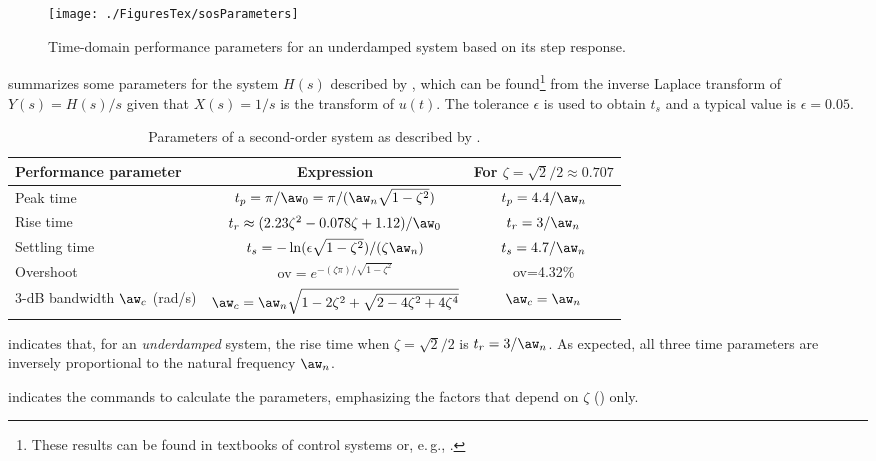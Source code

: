 \begin{figure}
\centering
\texttt{[image: ./FiguresTex/sosParameters]}
\caption{Time-domain performance parameters for an
underdamped system based on its step response.\label{fig:sosParameters}}
\end{figure}

 summarizes some parameters for the system $H(s)$ described by
, which can be found\footnote{These results can be found in
textbooks of control systems or, e.\,g., .} from the inverse Laplace transform of $Y(s) =  H(s)/s$ given that $X(s)=1/s$ is the transform of $u(t)$. The tolerance $\epsilon$ is used to obtain $t_s$ and a typical
value is $\epsilon = 0.05$.

\begin{table}
\centering
\caption{Parameters of a second-order system as described by .\label{tab:sosParameters}}
\begin{tabular}{|l|c|c|}
\hline
Performance parameter & Expression & For $\zeta=\sqrt{2}/2 \approx 0.707$ \\ \hline
Peak time  & $t_p = \pi / \aw_0 = \pi / (\aw_n \sqrt{1 - \zeta^2})$ & $t_p =4.4/\aw_n$ \\ \hline
Rise time & $t_r \approx (2.23 \zeta^2 - 0.078 \zeta + 1.12)/\aw_0$ & $t_r =3/\aw_n$ \\  \hline
Settling time & $t_s = - \ln(\epsilon \sqrt{1-\zeta^2})/(\zeta \aw_n)$ & $t_s =4.7 / \aw_n $ \\ \hline
Overshoot &  $\textrm{ov}=e^{- (\zeta \pi)/\sqrt{1 - \zeta^2}}$ & ov=4.32\% \\ \hline
3-dB bandwidth $\aw_c$ (rad/s) & $\aw_c = \aw_n \sqrt{1-2 \zeta^2 + \sqrt{2 - 4\zeta^2 + 4 \zeta^4}}$ & $\aw_c=\aw_n$ \\ \hline
\end{tabular}
\end{table}

 indicates that, for an \emph{underdamped} system, the rise time when
$\zeta=\sqrt{2}/2$ is $t_r=3/\aw_n$. As expected, all three time parameters are inversely
proportional to the natural frequency $\aw_n$.

 indicates the commands to calculate the parameters,
emphasizing the factors that depend on $\zeta$ () only.


